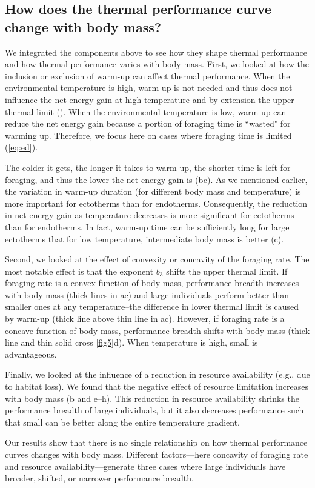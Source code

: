 \subsection*{How does the thermal performance curve change with body mass?}

We integrated the components above to see how they shape thermal performance and how thermal performance varies with body mass.
First, we looked at how the inclusion or exclusion of warm-up can affect thermal performance.
When the environmental temperature is high, warm-up is not needed and thus does not influence the net energy gain at high temperature and by extension the upper thermal limit ().
When the environmental temperature is low, warm-up can reduce the net energy gain because a portion of foraging time is ``wasted" for warming up.
Therefore, we focus here on cases where foraging time is limited (\cref{eq:ed}).

The colder it gets, the longer it takes to warm up, the shorter time is left for foraging, and thus the lower the net energy gain is (bc).
As we mentioned earlier, the variation in warm-up duration (for different body mass and temperature) is more important for ectotherms than for endotherms.
Consequently, the reduction in net energy gain as temperature decreases is more significant for ectotherms than for endotherms.
In fact, warm-up time can be sufficiently long for large ectotherms that for low temperature, intermediate body mass is better (c).

Second, we looked at the effect of convexity or concavity of the foraging rate.
The most notable effect is that the exponent $b_3$ shifts the upper thermal limit.
If foraging rate is a convex function of body mass, performance breadth increases with body mass (thick lines in ac) and large individuals perform better than smaller ones at any temperature--the difference in lower thermal limit is caused by warm-up (thick line above thin line in ac).
However, if foraging rate is a concave function of body mass, performance breadth shifts with body mass (thick line and thin solid cross \cref{fig5}d).
When temperature is high, small is advantageous.

Finally, we looked at the influence of a reduction in resource availability (e.g., due to habitat loss).
We found that the negative effect of resource limitation increases with body mass (b and e--h).
This reduction in resource availability shrinks the performance breadth of large individuals, but it also decreases performance such that small can be better along the entire temperature gradient.

Our results show that there is no single relationship on how thermal performance curves changes with body mass.
Different factors---here concavity of foraging rate and resource availability---generate three cases where large individuals have broader, shifted, or narrower performance breadth.

